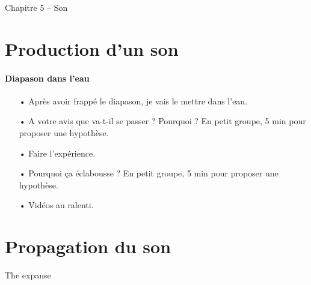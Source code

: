 \documentclass[12pt,a4paper]{article}
\begin{document}
\begin{header}
Chapitre 5 -- Son
\end{header}

\section{Production d'un son}

\paragraph{Diapason dans l'eau}
\begin{itemize}
\item[•] Après avoir frappé le diapason, je vais le mettre dans l'eau.
\item[•] A votre avis que va-t-il se passer ? Pourquoi ? En petit groupe, 5 min pour proposer une hypothèse.
\item[•] Faire l'expérience.
\item[•] Pourquoi ça éclabousse ? En petit groupe, 5 min pour proposer une hypothèse.
\item[•] Vidéos au ralenti.
\end{itemize}


\section{Propagation du son}

The expanse
\end{document}
